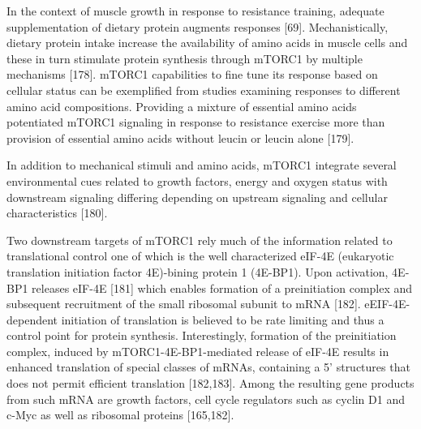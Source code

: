 \documentclass[twoside,10pt]{gihclass} %
\begin{document}
In the context of muscle growth in response to resistance training, adequate supplementation of dietary protein augments responses
{[}69{]}.
Mechanistically, dietary protein intake increase the availability of amino acids in muscle cells and these in turn stimulate protein synthesis through mTORC1 by multiple mechanisms
{[}178{]}.
mTORC1 capabilities to fine tune its response based on cellular status can be exemplified from studies examining responses to different amino acid compositions.
Providing a mixture of essential amino acids potentiated mTORC1 signaling in response to resistance exercise more than provision of essential amino acids without leucin or leucin alone
{[}179{]}.

In addition to mechanical stimuli and amino acids, mTORC1 integrate several environmental cues related to growth factors, energy and oxygen status with downstream signaling differing depending on upstream signaling and cellular characteristics
{[}180{]}.

Two downstream targets of mTORC1 rely much of the information related to translational control one of which is the well characterized eIF-4E (eukaryotic translation initiation factor 4E)-bining protein 1 (4E-BP1). Upon activation, 4E-BP1 releases eIF-4E
{[}181{]}
which enables formation of a preinitiation complex and subsequent recruitment of the small ribosomal subunit to mRNA
{[}182{]}.
eEIF-4E-dependent initiation of translation is believed to be rate limiting and thus a control point for protein synthesis.
Interestingly, formation of the preinitiation complex, induced by mTORC1-4E-BP1-mediated release of eIF-4E results in enhanced translation of special classes of mRNAs, containing a 5' structures that does not permit efficient translation
{[}182,183{]}.
Among the resulting gene products from such mRNA are growth factors, cell cycle regulators such as cyclin D1 and c-Myc as well as ribosomal proteins
{[}165,182{]}.
\end{document}
